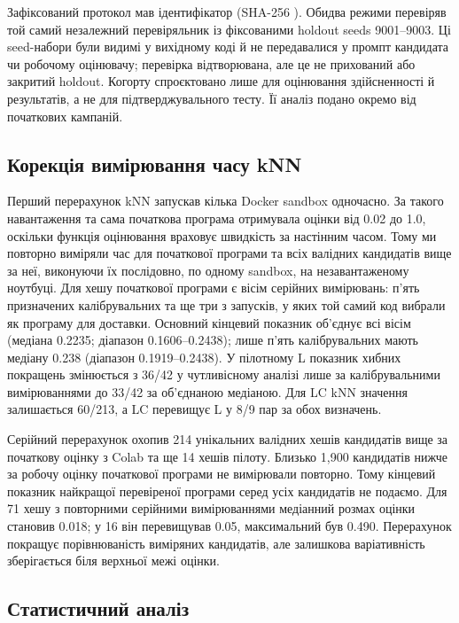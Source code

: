 \documentclass[11pt]{article}
\begin{document}
Зафіксований протокол мав ідентифікатор  (SHA-256 ). Обидва режими перевіряв той самий незалежний перевіряльник із фіксованими holdout seeds 9001--9003. Ці seed-набори були видимі у вихідному коді й не передавалися у промпт кандидата чи робочому оцінювачу; перевірка відтворювана, але це не прихований або закритий holdout. Когорту спроєктовано лише для оцінювання здійсненності й результатів, а не для підтверджувального тесту. Її аналіз подано окремо від початкових кампаній.

\subsection{Корекція вимірювання часу kNN}

Перший перерахунок kNN запускав кілька Docker sandbox одночасно. За такого навантаження та сама початкова програма отримувала оцінки від 0.02 до 1.0, оскільки функція оцінювання враховує швидкість за настінним часом. Тому ми повторно виміряли час для початкової програми та всіх валідних кандидатів вище за неї, виконуючи їх послідовно, по одному sandbox, на незавантаженому ноутбуці. Для хешу початкової програми є вісім серійних вимірювань: п'ять призначених калібрувальних та ще три з запусків, у яких той самий код вибрали як програму для доставки. Основний кінцевий показник об'єднує всі вісім (медіана 0.2235; діапазон 0.1606--0.2438); лише п'ять калібрувальних мають медіану 0.238 (діапазон 0.1919--0.2438). У пілотному L показник хибних покращень змінюється з 36/42 у чутливісному аналізі лише за калібрувальними вимірюваннями до 33/42 за об'єднаною медіаною. Для LC kNN значення залишається 60/213, а LC перевищує L у 8/9 пар за обох визначень.

Серійний перерахунок охопив 214 унікальних валідних хешів кандидатів вище за початкову оцінку з Colab та ще 14 хешів пілоту. Близько 1{,}900 кандидатів нижче за робочу оцінку початкової програми не вимірювали повторно. Тому кінцевий показник найкращої перевіреної програми серед усіх кандидатів не подаємо. Для 71 хешу з повторними серійними вимірюваннями медіанний розмах оцінки становив 0.018; у 16 він перевищував 0.05, максимальний був 0.490. Перерахунок покращує порівнюваність виміряних кандидатів, але залишкова варіативність зберігається біля верхньої межі оцінки.

\subsection{Статистичний аналіз}
\end{document}
